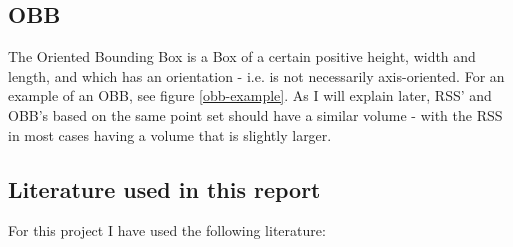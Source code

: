 \subsection{OBB}
The Oriented Bounding Box is a Box of a certain positive height, width and length, and which has an orientation - i.e. is not necessarily axis-oriented. For an example of an OBB, see figure \ref{obb-example}. As I will explain later, RSS' and OBB's based on the same point set should have a similar volume - with the RSS in most cases having a volume that is slightly larger. 

\subsection{Literature used in this report}
\label{lit}
For this project I have used the following literature:
